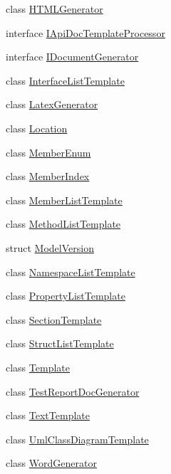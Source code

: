 \begin{DoxyCompactItemize}
\item 
class \hyperlink{class_software_engineering_tools_1_1_documentation_1_1_h_t_m_l_generator}{H\+T\+M\+L\+Generator}
\item 
interface \hyperlink{interface_software_engineering_tools_1_1_documentation_1_1_i_api_doc_template_processor}{I\+Api\+Doc\+Template\+Processor}
\item 
interface \hyperlink{interface_software_engineering_tools_1_1_documentation_1_1_i_document_generator}{I\+Document\+Generator}
\item 
class \hyperlink{class_software_engineering_tools_1_1_documentation_1_1_interface_list_template}{Interface\+List\+Template}
\item 
class \hyperlink{class_software_engineering_tools_1_1_documentation_1_1_latex_generator}{Latex\+Generator}
\item 
class \hyperlink{class_software_engineering_tools_1_1_documentation_1_1_location}{Location}
\item 
class \hyperlink{class_software_engineering_tools_1_1_documentation_1_1_member_enum}{Member\+Enum}
\item 
class \hyperlink{class_software_engineering_tools_1_1_documentation_1_1_member_index}{Member\+Index}
\item 
class \hyperlink{class_software_engineering_tools_1_1_documentation_1_1_member_list_template}{Member\+List\+Template}
\item 
class \hyperlink{class_software_engineering_tools_1_1_documentation_1_1_method_list_template}{Method\+List\+Template}
\item 
struct \hyperlink{struct_software_engineering_tools_1_1_documentation_1_1_model_version}{Model\+Version}
\item 
class \hyperlink{class_software_engineering_tools_1_1_documentation_1_1_namespace_list_template}{Namespace\+List\+Template}
\item 
class \hyperlink{class_software_engineering_tools_1_1_documentation_1_1_property_list_template}{Property\+List\+Template}
\item 
class \hyperlink{class_software_engineering_tools_1_1_documentation_1_1_section_template}{Section\+Template}
\item 
class \hyperlink{class_software_engineering_tools_1_1_documentation_1_1_struct_list_template}{Struct\+List\+Template}
\item 
class \hyperlink{class_software_engineering_tools_1_1_documentation_1_1_template}{Template}
\item 
class \hyperlink{class_software_engineering_tools_1_1_documentation_1_1_test_report_doc_generator}{Test\+Report\+Doc\+Generator}
\item 
class \hyperlink{class_software_engineering_tools_1_1_documentation_1_1_text_template}{Text\+Template}
\item 
class \hyperlink{class_software_engineering_tools_1_1_documentation_1_1_uml_class_diagram_template}{Uml\+Class\+Diagram\+Template}
\item 
class \hyperlink{class_software_engineering_tools_1_1_documentation_1_1_word_generator}{Word\+Generator}
\end{DoxyCompactItemize}
